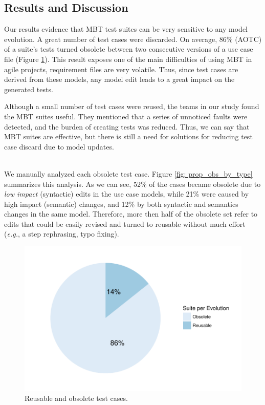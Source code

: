 \subsection{Results and Discussion}
Our results evidence that MBT test suites can be very sensitive to any model evolution. A great number of test cases were discarded. On average, 86\% (AOTC) of a suite's tests turned obsolete between two consecutive versions of a use case file (Figure \ref{fig: prop_reus_obs}). This result exposes one of the main difficulties of using MBT in agile projects, requirement files are very volatile. Thus, since test cases are derived from these models, any model edit leads to a great impact on the generated tests. 

Although a small number of test cases were reused, the teams in our study found the MBT suites useful. They mentioned that a series of unnoticed faults were detected, and the burden of creating tests was reduced. Thus, we can say that MBT suites are effective, but there is still a need for solutions for reducing test case discard due to model updates.
\\
\\
\noindent
\vspace{2mm} %
\vspace{2mm} %


We manually analyzed each obsolete test case. 
Figure \ref{fig: prop_obs_by_type} summarizes this analysis. As we can see, 52\% of the cases became obsolete due to \textit{low impact} (syntactic) edits in the use case models, while 21\% were caused by high impact (semantic) changes, and 12\% by both syntactic and semantics changes in the same model. Therefore, more then half of the obsolete set refer to edits that could be easily revised and turned to reusable without much effort (\textit{e.g.}, a step rephrasing, typo fixing). 

\begin{figure}[h]
\centering
\includegraphics[width=.48\textwidth]{figs/v2_prop_reus_obs.pdf}
\caption{Reusable and obsolete test cases.}
\label{fig: prop_reus_obs}
\end{figure}

